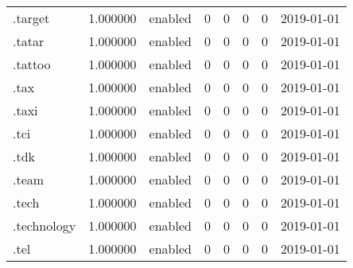 \begin{tabular}{lrlrrrrl}
.target                   &          1.000000 &         enabled &                           0 &                           0 &                           0 &                   0 &           2019-01-01 \\
.tatar                    &          1.000000 &         enabled &                           0 &                           0 &                           0 &                   0 &           2019-01-01 \\
.tattoo                   &          1.000000 &         enabled &                           0 &                           0 &                           0 &                   0 &           2019-01-01 \\
.tax                      &          1.000000 &         enabled &                           0 &                           0 &                           0 &                   0 &           2019-01-01 \\
.taxi                     &          1.000000 &         enabled &                           0 &                           0 &                           0 &                   0 &           2019-01-01 \\
.tci                      &          1.000000 &         enabled &                           0 &                           0 &                           0 &                   0 &           2019-01-01 \\
.tdk                      &          1.000000 &         enabled &                           0 &                           0 &                           0 &                   0 &           2019-01-01 \\
.team                     &          1.000000 &         enabled &                           0 &                           0 &                           0 &                   0 &           2019-01-01 \\
.tech                     &          1.000000 &         enabled &                           0 &                           0 &                           0 &                   0 &           2019-01-01 \\
.technology               &          1.000000 &         enabled &                           0 &                           0 &                           0 &                   0 &           2019-01-01 \\
.tel                      &          1.000000 &         enabled &                           0 &                           0 &                           0 &                   0 &           2019-01-01 \\

\end{tabular}

